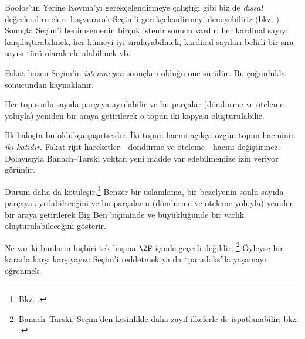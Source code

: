 


Boolos'un Yerine Koyma'yı gerekçelendirmeye çalıştığı gibi biz de
\emph{dışsal} değerlendirmelere başvurarak Seçim'i gerekçelendirmeyi
deneyebiliriz (bkz. ). Sonuçta Seçim'i
benimsemenin birçok istenir sonucu vardır: her kardinal sayıyı
karşılaştırabilmek, her kümeyi iyi sıralayabilmek, kardinal sayıları belirli
bir sıra sayısı türü olarak ele alabilmek vb.

Fakat bazen Seçim'in \emph{istenmeyen} sonuçları olduğu öne sürülür.
Bu çoğunlukla \cite{BanachTarski1924} sonucundan kaynaklanır.

\begin{thm}
Her top sonlu sayıda parçaya ayrılabilir ve bu parçalar (döndürme ve
öteleme yoluyla) yeniden bir araya getirilerek o topun iki kopyası
oluşturulabilir.
\end{thm}
\noindent
İlk bakışta bu oldukça şaşırtıcıdır. İki topun hacmi açıkça özgün topun
hacminin \emph{iki katıdır}. Fakat rijit hareketler---döndürme ve
öteleme---hacmi değiştirmez. Dolayısıyla Banach--Tarski yoktan yeni madde
var edebilmemize izin veriyor görünür.

Durum daha da kötüleşir.\footnote{Bkz.
\citet[Theorem 3.12]{Wagon2016}.} Benzer bir uslamlama, bir bezelyenin sonlu
sayıda parçaya ayrılabileceğini ve bu parçaların (döndürme ve öteleme
yoluyla) yeniden bir araya getirilerek Big Ben biçiminde ve büyüklüğünde
bir varlık oluşturulabileceğini gösterir.

Ne var ki bunların hiçbiri tek başına $\ZF$ içinde geçerli değildir.
\footnote{Banach--Tarski, Seçim'den kesinlikle daha zayıf ilkelerle de
ispatlanabilir; bkz. \citet[303]{Wagon2016}.} Öyleyse bir kararla karşı
karşıyayız: Seçim'i reddetmek ya da ``paradoks''la yaşamayı öğrenmek.


